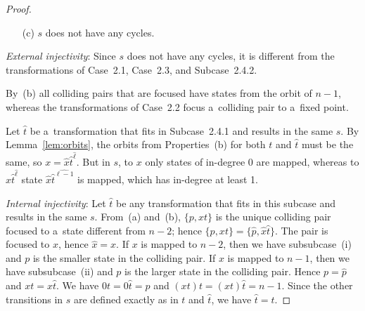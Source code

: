 \documentclass{amsart}
\newcommand{\e}[1]{\hat{#1}}
\begin{document}
\begin{proof}
\begin{enumerate}
\item[(c)] $s$ does not have any cycles.
\end{enumerate}

\textit{External injectivity}:
Since $s$ does not have any cycles, it is different from the transformations of Case~2.1, Case~2.3, and Subcase~2.4.2.

By~(b) all colliding pairs that are focused have states from the orbit of $n-1$, whereas the transformations of Case~2.2 focus a~colliding pair to a~fixed point.

Let $\e{t}$ be a~transformation that fits in Subcase~2.4.1 and results in the same $s$.
By Lemma~\ref{lem:orbits}, the orbits from Properties~(b) for both $t$ and $\e{t}$ must be the same, so $x = \e{x}\e{t}^{\e{\ell}}$.
But in $s$, to $x$ only states of in-degree 0 are mapped, whereas to $\e{x}\e{t}^{\e{\ell}}$ state $\e{x}\e{t}^{\e{\ell-1}}$ is mapped, which has in-degree at least 1.

\textit{Internal injectivity}:
Let $\e{t}$ be any transformation that fits in this subcase and results in the same $s$.
From~(a) and~(b), $\{p,xt\}$ is the unique colliding pair focused to a~state different from $n-2$; hence $\{p,xt\} = \{\e{p},\e{x}\e{t}\}$.
The pair is focused to $x$, hence $\e{x} = x$.
If $x$ is mapped to $n-2$, then we have subsubcase~(i) and $p$ is the smaller state in the colliding pair.
If $x$ is mapped to $n-1$, then we have subsubcase~(ii) and $p$ is the larger state in the colliding pair.
Hence $p = \e{p}$ and $xt = x\e{t}$. We have $0t = 0\e{t} = p$ and $(xt)t = (xt)\e{t} = n-1$.
Since the other transitions in $s$ are defined exactly as in $t$ and $\e{t}$, we have $\e{t} = t$.


\end{proof}
\end{document}
